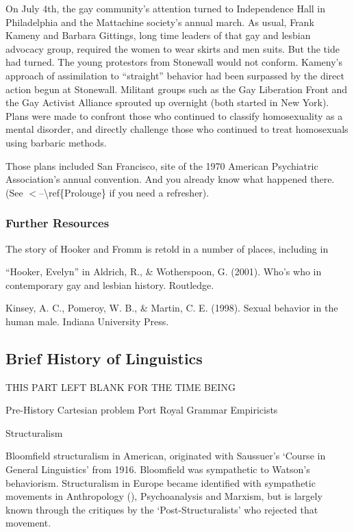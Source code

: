 On July 4th, the gay community's attention turned to Independence Hall in Philadelphia and the Mattachine society's annual march. As usual, Frank Kameny and Barbara Gittings, long time leaders of that gay and lesbian advocacy group, required the women to wear skirts and men suits. But the tide had turned. The young protestors from Stonewall would not conform. Kameny's approach of assimilation to ``straight'' behavior had been surpassed by the direct action begun at Stonewall. Militant groups such as the Gay Liberation Front and the Gay Activist Alliance sprouted up overnight (both started in New York). Plans were made to confront those who continued to classify homosexuality as a mental disorder, and directly challenge those who continued to treat homosexuals using barbaric methods.

Those plans included San Francisco, site of the 1970 American Psychiatric Association's annual convention. And you already know what happened there. (See $<$--\textbackslash{}ref\{Prolouge\} if you need a refresher).

\subsubsection{Further Resources}
\label{furtherresources}

The story of Hooker and Fromm is retold in a number of places, including in

``Hooker, Evelyn'' in Aldrich, R., \& Wotherspoon, G. (2001). Who's who in contemporary gay and lesbian history. Routledge.

Kinsey, A. C., Pomeroy, W. B., \& Martin, C. E. (1998). Sexual behavior in the human male. Indiana University Press.

\subsection{Brief History of Linguistics}
\label{briefhistoryoflinguistics}

THIS PART LEFT BLANK FOR THE TIME BEING

Pre-History
Cartesian problem
Port Royal Grammar
Empiricists

Structuralism

Bloomfield structuralism in American, originated with Saussuer's `Course in General Linguistics' from 1916. Bloomfield was sympathetic to Watson's behaviorism. Structuralism in Europe became identified with sympathetic movements in Anthropology (), Psychoanalysis and Marxism, but is largely known through the critiques by the `Post-Structuralists' who rejected that movement.

